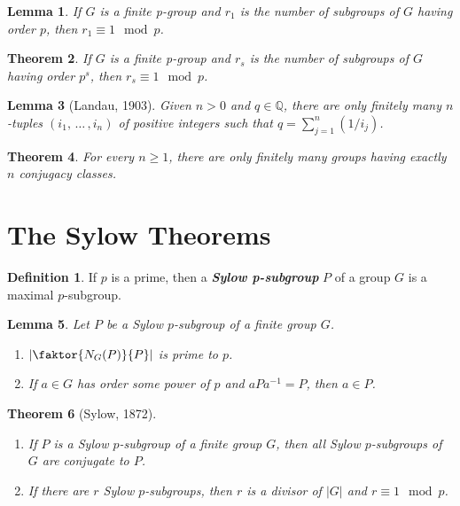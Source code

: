 \documentclass[12pt]{report}
\newtheorem{theorem}{Theorem}[chapter]
\newtheorem{lemma}[theorem]{Lemma}
\theoremstyle{definition}
\newtheorem*{definition}{Definition}
\newcommand{\term}[1]{\textbf{\textit{#1}}}
\begin{document}
\begin{lemma}
	If $G$ is a finite p-group and $r_1$ is the number of subgroups of $G$ having order $p$, then $r_1\equiv 1\mod p$.
\end{lemma}

\begin{theorem}
	If $G$ is a finite p-group and $r_s$ is the number of subgroups of $G$ having order $p^s$, then $r_s\equiv 1\mod p$.
\end{theorem}

\begin{lemma}[Landau, 1903]
	Given $n>0$ and $q\in\mathbb{Q}$, there are only finitely many $n$-tuples $(i_1,\,\ldots\,,i_n)$ of positive integers such that $q=\sum_{j=1}^n (1/i_j)$.
\end{lemma}

\begin{theorem}
	For every $n\geq 1$, there are only finitely many groups having exactly $n$ conjugacy classes.
\end{theorem}

\section{The Sylow Theorems}
\begin{definition}
	If $p$ is a prime, then a \term{Sylow p-subgroup} $P$ of a group $G$ is a maximal $p$-subgroup.
\end{definition}

\begin{lemma}
	Let $P$ be a Sylow $p$-subgroup of a finite group $G$.
	\begin{enumerate}
		\item $\left|\faktor{N_G(P)}{P}\right|$ is prime to $p$.
		\item If $a\in G$ has order some power of $p$ and $aPa^{-1}=P$, then $a\in P$.
	\end{enumerate}
\end{lemma}

\begin{theorem}[Sylow, 1872]
	\quad
	\begin{enumerate}
		\item If $P$ is a Sylow $p$-subgroup of a finite group $G$, then all Sylow $p$-subgroups of $G$ are conjugate to $P$.
		\item If there are $r$ Sylow $p$-subgroups, then $r$ is a divisor of $|G|$ and $r\equiv 1\mod p$.
	\end{enumerate}
\end{theorem}
\end{document}
